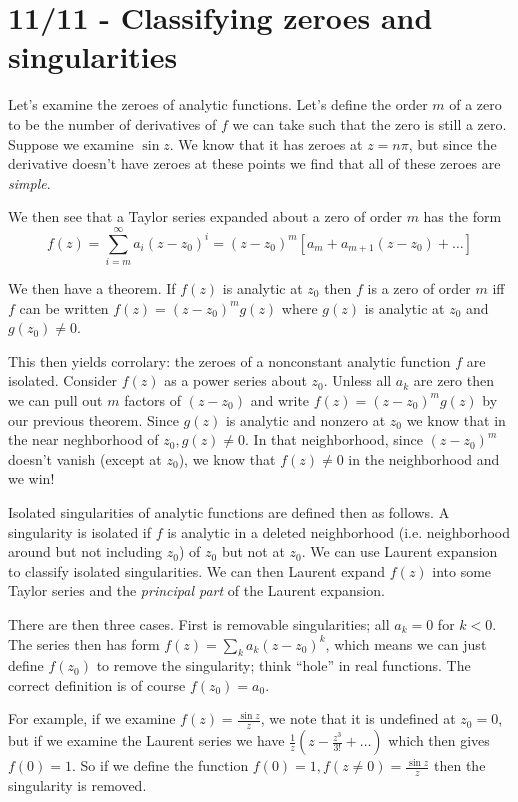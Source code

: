 \documentclass[10pt]{report}
\begin{document}
\chapter{11/11 - Classifying zeroes and singularities}

Let's examine the zeroes of analytic functions. Let's define the order $m$ of a zero to be the number of derivatives of $f$ we can take such that the zero is still a zero. Suppose we examine $\sin z$. We know that it has zeroes at $z=n\pi$, but since the derivative doesn't have zeroes at these points we find that all of these zeroes are \emph{simple}.

We then see that a Taylor series expanded about a zero of order $m$ has the form
$$f(z) = \sum_{i=m}^\infty a_i(z-z_0)^i = (z-z_0)^m\left[ a_m + a_{m+1}(z-z_0) +\dots \right]$$

We then have a theorem. If $f(z)$ is analytic at $z_0$ then $f$ is a zero of order $m$ iff $f$ can be written $f(z) = (z-z_0)^mg(z)$ where $g(z)$ is analytic at $z_0$ and $g(z_0) \neq 0$.

This then yields corrolary: the zeroes of a nonconstant analytic function $f$ are isolated. Consider $f(z)$ as a power series about $z_0$. Unless all $a_k$ are zero then we can pull out $m$ factors of $(z-z_0)$ and write $f(z) = (z-z_0)^mg(z)$ by our previous theorem. Since $g(z)$ is analytic and nonzero at $z_0$ we know that in the near neghborhood of $z_0, g(z) \neq 0$. In that neighborhood, since $(z-z_0)^m$ doesn't vanish (except at $z_0$), we know that $f(z) \neq 0$ in the neighborhood and we win!

Isolated singularities of analytic functions are defined then as follows. A singularity is isolated if $f$ is analytic in a deleted neighborhood (i.e. neighborhood around but not including $z_0$) of $z_0$ but not at $z_0$. We can use Laurent expansion to classify isolated singularities. We can then Laurent expand $f(z)$ into some Taylor series and the \emph{principal part} of the Laurent expansion. 

There are then three cases. First is removable singularities; all $a_k = 0$ for $k < 0$. The series then has form $f(z) = \sum_k a_k (z-z_0)^k$, which means we can just define $f(z_0)$ to remove the singularity; think ``hole'' in real functions. The correct definition is of course $f(z_0) = a_0$. 

For example, if we examine $f(z) = \frac{\sin z}{z}$, we note that it is undefined at $z_0 = 0$, but if we examine the Laurent series we have $\frac{1}{z}\left( z - \frac{z^3}{3!} +\dots \right)$ which then gives $f(0) = 1$. So if we define the function $f(0) = 1, f(z \neq 0) = \frac{\sin z}{z}$ then the singularity is removed.
\end{document}
